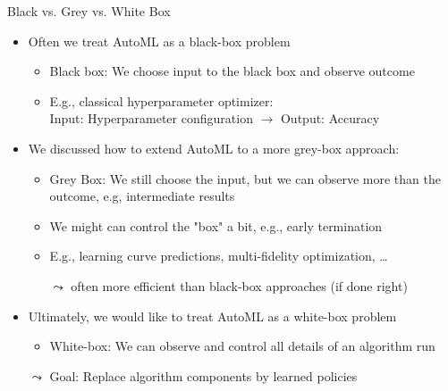 \begin{frame}[c]{Black vs. Grey vs. White Box}

\begin{itemize}
	\item Often we treat AutoML as a \alert{black-box problem}
	\begin{itemize}
		\item Black box: We choose input to the black box and observe outcome
		\pause
		\item E.g., classical hyperparameter optimizer:\\ Input: Hyperparameter configuration $\to$ Output: Accuracy
	\end{itemize}
   \pause
   \smallskip
   \item We discussed how to extend AutoML to a more \alert{grey-box approach}:	
   \begin{itemize}
     	\item Grey Box: We still choose the input, but we can observe more than the outcome, e.g, intermediate results
     	\pause
     	\item We might can control the "box" a bit,  e.g., early termination
     	\pause
        \item E.g., learning curve predictions, multi-fidelity optimization, \ldots
        \pause
        \item[$\leadsto$] often more efficient than black-box approaches (if done right)
   \end{itemize}
   \pause
   \smallskip
   \item Ultimately, we would like to treat AutoML as a \alert{white-box problem}
   \begin{itemize}
     	\item White-box: We can observe and control all details of an algorithm run
   \end{itemize}
	\pause
	\medskip
   \item[$\leadsto$] Goal: \alert{Replace algorithm components by learned policies}
\end{itemize}


\end{frame}
